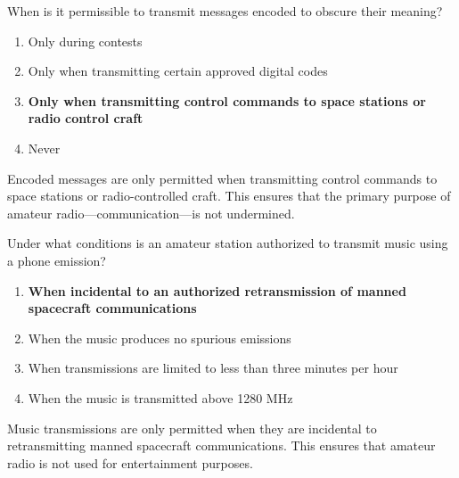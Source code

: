 \begin{tcolorbox}[colback=gray!10!white,colframe=black!75!black,title={T1D03}]
    When is it permissible to transmit messages encoded to obscure their meaning?
    \begin{enumerate}[label=\Alph*),noitemsep]
        \item Only during contests
        \item Only when transmitting certain approved digital codes
        \item \textbf{Only when transmitting control commands to space stations or radio control craft}
        \item Never
    \end{enumerate}
\end{tcolorbox}
Encoded messages are only permitted when transmitting control commands to space stations or radio-controlled craft. This ensures that the primary purpose of amateur radio—communication—is not undermined.


\begin{tcolorbox}[colback=gray!10!white,colframe=black!75!black,title={T1D04}]
    Under what conditions is an amateur station authorized to transmit music using a phone emission?
    \begin{enumerate}[label=\Alph*),noitemsep]
        \item \textbf{When incidental to an authorized retransmission of manned spacecraft communications}
        \item When the music produces no spurious emissions
        \item When transmissions are limited to less than three minutes per hour
        \item When the music is transmitted above 1280 MHz
    \end{enumerate}
\end{tcolorbox}
Music transmissions are only permitted when they are incidental to retransmitting manned spacecraft communications. This ensures that amateur radio is not used for entertainment purposes.


